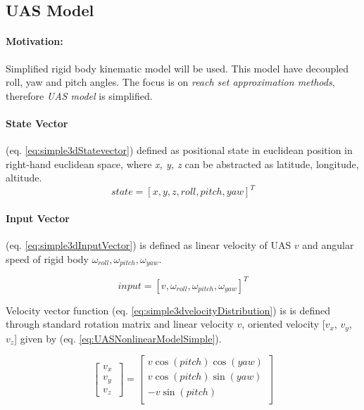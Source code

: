 \subsection{UAS Model}\label{s:UASNonlinearModel}
\paragraph{Motivation:} Simplified rigid body kinematic model will be used. This model have decoupled roll, yaw and pitch angles. The focus is on \emph{reach set approximation methods}, therefore \emph{UAS model} is simplified.

\paragraph{State Vector} (eq. \ref{eq:simple3dStatevector}) defined as positional state in euclidean position in right-hand euclidean space, where \emph{x, y, z} can be abstracted as latitude, longitude, altitude.
\begin{equation}\label{eq:simple3dStatevector}
    state = \left [ x,y,z, roll, pitch, yaw \right]^T
\end{equation}


\paragraph{Input Vector} (eq. \ref{eq:simple3dInputVector}) is defined as linear velocity of UAS $v$ and angular speed of rigid body $\omega_{roll}, \omega_{pitch},\omega_{yaw}$.

\begin{equation}\label{eq:simple3dInputVector}
    input = \left [ v, \omega_{roll}, \omega_{pitch},\omega_{yaw}\right ]^T
\end{equation}


\noindent Velocity vector function (eq. \ref{eq:simple3dvelocityDistribution})  is is defined through standard rotation matrix  and linear velocity $v$, oriented velocity [$v_x$, $v_y$, $v_z$] given by (eq. \ref{eq:UASNonlinearModelSimple}).

\begin{equation}\label{eq:simple3dvelocityDistribution}
    \begin{bmatrix}
    v_x\\
    v_y\\
    v_z\
    \end{bmatrix}
    =
    \begin{bmatrix}
         v\cos(pitch)\cos(yaw)\\
         v\cos(pitch)\sin(yaw)\\
         -v\sin(pitch)\\
    \end{bmatrix}
\end{equation}

